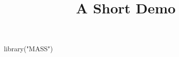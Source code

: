 \documentclass[article]{jss}
\title{A Short Demo}
\begin{document}
\begin{CodeInput}
library("MASS")
\end{CodeInput}
\end{document}

